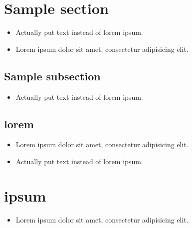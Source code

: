 \section{Sample section}  %
    \begin{itemize}[noitemsep]
        \item {\color{red}Actually put text instead of lorem ipsum.}  %
        \item Lorem ipsum dolor sit amet, consectetur adipisicing elit.  %
    \end{itemize}
\subsection{Sample subsection}  %
    \begin{itemize}[noitemsep]
        \item {\color{red} Actually put text instead of lorem ipsum.}  %
    \end{itemize}
\subsection{lorem}  %
    \begin{itemize}[noitemsep]
        \item Lorem ipsum dolor sit amet, consectetur adipisicing elit.  %
        \item {\color{red}Actually put text instead of lorem ipsum.}  %
    \end{itemize}
\section{ipsum}  %
    \begin{itemize}[noitemsep]
        \item Lorem ipsum dolor sit amet, consectetur adipisicing elit.  %
    \end{itemize}
